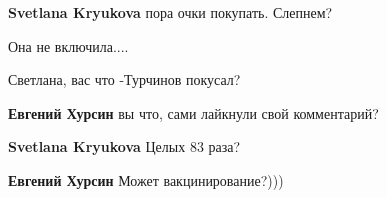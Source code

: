 \begin{itemize}
\begin{itemize}
 
\textbf{Svetlana Kryukova} пора очки покупать. Слепнем?

 
Она не включила....

\end{itemize}

 

Светлана, вас что -Турчинов покусал?

\begin{itemize}

 
\textbf{Евгений Хурсин} вы что, сами лайкнули свой комментарий?

 
\textbf{Svetlana Kryukova} Целых 83 раза?

 
\textbf{Евгений Хурсин} Может вакцинирование?)))

 

\end{itemize}
\end{itemize}
